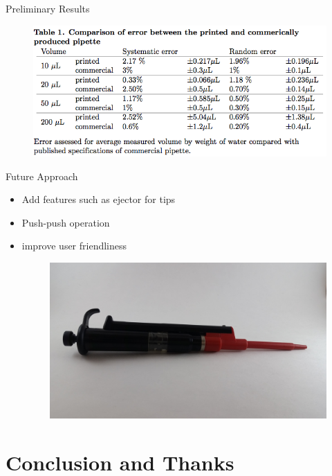\documentclass{beamer}
\begin{document}
\begin{frame}{Preliminary Results}
\begin{figure}
		\includegraphics[width=.8\linewidth]{images/pipette-data.png}
	\end{figure}
\end{frame}

\begin{frame}{Future Approach}
\begin{itemize}
\item Add features such as ejector for tips
\item Push-push operation
\item improve user friendliness
\begin{figure}
		\includegraphics[width=.8\linewidth]{images/finnpipette.jpg}
	\end{figure}
 \end{itemize}
\end{frame}


\section{Conclusion and Thanks}
\end{document}
